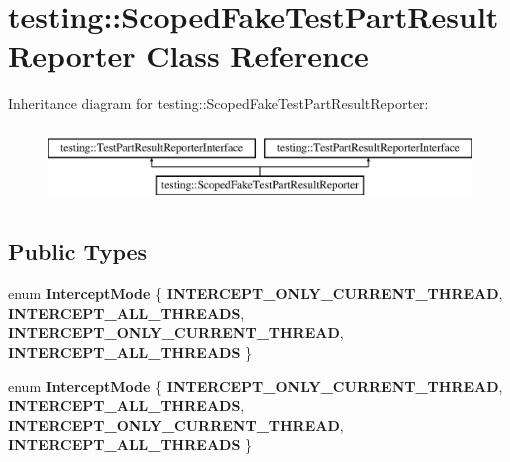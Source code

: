\hypertarget{classtesting_1_1_scoped_fake_test_part_result_reporter}{}\section{testing\+:\+:Scoped\+Fake\+Test\+Part\+Result\+Reporter Class Reference}
\label{classtesting_1_1_scoped_fake_test_part_result_reporter}
Inheritance diagram for testing\+:\+:Scoped\+Fake\+Test\+Part\+Result\+Reporter\+:\begin{figure}[H]
\begin{center}
\leavevmode
\includegraphics[height=2.000000cm]{classtesting_1_1_scoped_fake_test_part_result_reporter}
\end{center}
\end{figure}
\subsection*{Public Types}
\begin{DoxyCompactItemize}
\item 
\hypertarget{classtesting_1_1_scoped_fake_test_part_result_reporter_a82f6209b3cf5c4b15ec8bd8041dbc2d5}{}enum {\bfseries Intercept\+Mode} \{ {\bfseries I\+N\+T\+E\+R\+C\+E\+P\+T\+\_\+\+O\+N\+L\+Y\+\_\+\+C\+U\+R\+R\+E\+N\+T\+\_\+\+T\+H\+R\+E\+A\+D}, 
{\bfseries I\+N\+T\+E\+R\+C\+E\+P\+T\+\_\+\+A\+L\+L\+\_\+\+T\+H\+R\+E\+A\+D\+S}, 
{\bfseries I\+N\+T\+E\+R\+C\+E\+P\+T\+\_\+\+O\+N\+L\+Y\+\_\+\+C\+U\+R\+R\+E\+N\+T\+\_\+\+T\+H\+R\+E\+A\+D}, 
{\bfseries I\+N\+T\+E\+R\+C\+E\+P\+T\+\_\+\+A\+L\+L\+\_\+\+T\+H\+R\+E\+A\+D\+S}
 \}\label{classtesting_1_1_scoped_fake_test_part_result_reporter_a82f6209b3cf5c4b15ec8bd8041dbc2d5}

\item 
\hypertarget{classtesting_1_1_scoped_fake_test_part_result_reporter_a82f6209b3cf5c4b15ec8bd8041dbc2d5}{}enum {\bfseries Intercept\+Mode} \{ {\bfseries I\+N\+T\+E\+R\+C\+E\+P\+T\+\_\+\+O\+N\+L\+Y\+\_\+\+C\+U\+R\+R\+E\+N\+T\+\_\+\+T\+H\+R\+E\+A\+D}, 
{\bfseries I\+N\+T\+E\+R\+C\+E\+P\+T\+\_\+\+A\+L\+L\+\_\+\+T\+H\+R\+E\+A\+D\+S}, 
{\bfseries I\+N\+T\+E\+R\+C\+E\+P\+T\+\_\+\+O\+N\+L\+Y\+\_\+\+C\+U\+R\+R\+E\+N\+T\+\_\+\+T\+H\+R\+E\+A\+D}, 
{\bfseries I\+N\+T\+E\+R\+C\+E\+P\+T\+\_\+\+A\+L\+L\+\_\+\+T\+H\+R\+E\+A\+D\+S}
 \}\label{classtesting_1_1_scoped_fake_test_part_result_reporter_a82f6209b3cf5c4b15ec8bd8041dbc2d5}

\end{DoxyCompactItemize}
